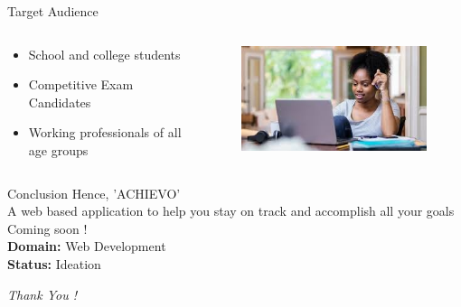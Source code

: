 \documentclass{beamer}
\begin{document}
	\begin{frame}{Target Audience}
	\begin{columns}
        \begin{column}{0.7\textwidth} %
			\begin{itemize}
			\item School and college students
			\item Competitive Exam Candidates
			\item Working professionals of all age groups
			\end{itemize}

    	\end{column}
        
    	\begin{column}{0.3\textwidth} %
            \begin{figure}
                \includegraphics[width=\textwidth]{student.jpeg}
            \end{figure}
    	\end{column}
    \end{columns}
	\end{frame}



	\begin{frame}{Conclusion}
		\justifying
		Hence, 'ACHIEVO' \\ 
		A web based application to help you stay
		on track and accomplish all your goals \\
	        Coming soon ! \\
		\textbf{Domain: } Web Development \\
		\textbf{Status: } Ideation \\
		
		\bigskip
		
		\Huge\textit{Thank You !}
	\end{frame}
\end{document}
